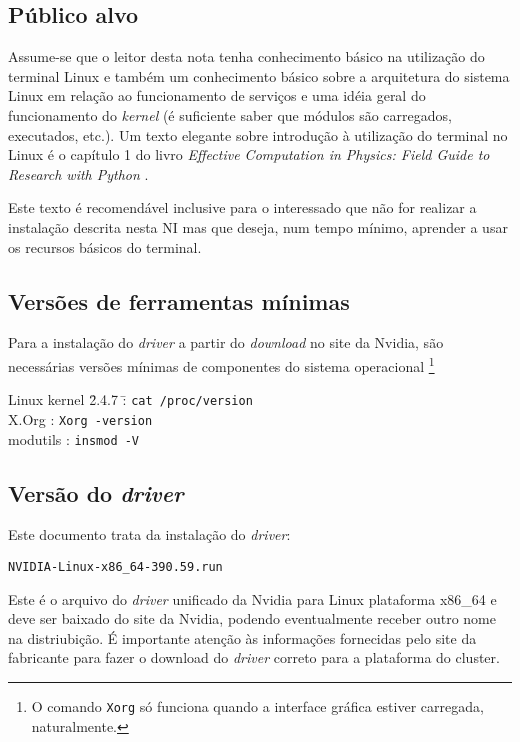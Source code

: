 \documentclass[twoside,a4paper,12pt,english]{inac17}
\begin{document}
\subsection{Público alvo}

Assume-se que o leitor desta nota tenha conhecimento básico na utilização do 
terminal Linux e também um conhecimento básico sobre a arquitetura do sistema 
Linux em relação ao funcionamento de serviços e uma idéia geral do funcionamento 
do \textit{kernel} (é suficiente saber que módulos são carregados, executados, etc.).
Um texto elegante sobre introdução à utilização do terminal no Linux é o capítulo 
1 do livro \textit{Effective Computation in Physics: Field Guide to Research with Python} \cite{Scopatz2015}.

Este texto é recomendável inclusive para o interessado que não for realizar a instalação descrita nesta NI mas que deseja, num tempo mínimo, aprender a usar 
os recursos básicos do terminal.

\subsection{Versões de ferramentas mínimas}

Para a instalação do \textit{driver} a partir do \textit{download} 
no site da Nvidia, são necessárias versões mínimas de componentes 
do sistema operacional \footnote{O comando \texttt{Xorg} só funciona 
quando a interface gráfica estiver carregada, naturalmente.}

\begin{tabbing}
Linux kernel \= 2.4.7 \= : \= \texttt{cat /proc/version} \\
X.Org  \> : \> \texttt{Xorg -version} \\
modutils  \> : \> \texttt{insmod -V}
\end{tabbing}

\subsection{Versão do \textit{driver}}

Este documento trata da instalação do \textit{driver}:

\texttt{NVIDIA-Linux-x86\_64-390.59.run}

Este é o arquivo do \textit{driver} unificado da Nvidia para 
Linux plataforma x86\_64 e deve ser baixado do site da Nvidia, podendo  eventualmente receber outro nome na distriubição. É importante 
atenção às informações fornecidas pelo site da fabricante para 
fazer o download do \textit{driver} correto para a plataforma 
do cluster.
\end{document}
